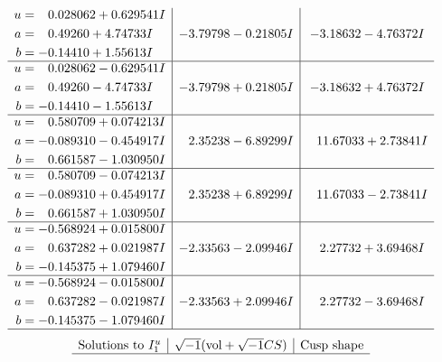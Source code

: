 \documentclass[1p]{elsarticle_modified}
\theoremstyle{definition}
\newcommand{\I}{\sqrt{-1}}
\begin{document}
$$\begin{array}{c|c|c}
\begin{aligned}
u &= \phantom{-}0.028062 + 0.629541 I \\
a &= \phantom{-}0.49260 + 4.74733 I \\
b &= -0.14410 + 1.55613 I\end{aligned}
 & -3.79798 - 0.21805 I & -3.18632 - 4.76372 I \\ \hline\begin{aligned}
u &= \phantom{-}0.028062 - 0.629541 I \\
a &= \phantom{-}0.49260 - 4.74733 I \\
b &= -0.14410 - 1.55613 I\end{aligned}
 & -3.79798 + 0.21805 I & -3.18632 + 4.76372 I \\ \hline\begin{aligned}
u &= \phantom{-}0.580709 + 0.074213 I \\
a &= -0.089310 - 0.454917 I \\
b &= \phantom{-}0.661587 - 1.030950 I\end{aligned}
 & \phantom{-}2.35238 - 6.89299 I & \phantom{-}11.67033 + 2.73841 I \\ \hline\begin{aligned}
u &= \phantom{-}0.580709 - 0.074213 I \\
a &= -0.089310 + 0.454917 I \\
b &= \phantom{-}0.661587 + 1.030950 I\end{aligned}
 & \phantom{-}2.35238 + 6.89299 I & \phantom{-}11.67033 - 2.73841 I \\ \hline\begin{aligned}
u &= -0.568924 + 0.015800 I \\
a &= \phantom{-}0.637282 + 0.021987 I \\
b &= -0.145375 + 1.079460 I\end{aligned}
 & -2.33563 - 2.09946 I & \phantom{-}2.27732 + 3.69468 I \\ \hline\begin{aligned}
u &= -0.568924 - 0.015800 I \\
a &= \phantom{-}0.637282 - 0.021987 I \\
b &= -0.145375 - 1.079460 I\end{aligned}
 & -2.33563 + 2.09946 I & \phantom{-}2.27732 - 3.69468 I\\
 \hline 
 \end{array}$$\newpage$$\begin{array}{c|c|c}  
\text{Solutions to }I^u_{1}& \I (\text{vol} + \sqrt{-1}CS) & \text{Cusp shape}\\
 \hline 

\end{array}$$
\end{document}
